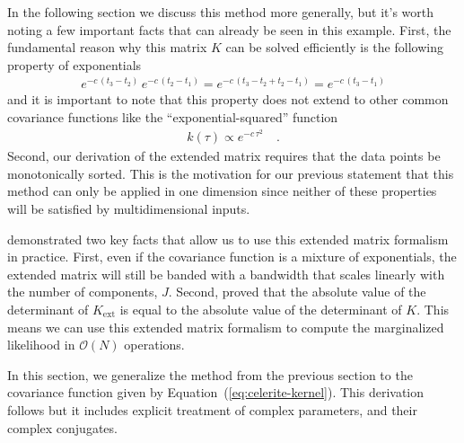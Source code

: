 \documentclass[manuscript, letterpaper]{aastex6}
\makeatletter
\let\origsubsection\subsection
\renewcommand\subsection{\@ifstar{\starsubsection}{\nostarsubsection}}
\newcommand\nostarsubsection[1]{\subsectionprelude\origsubsection{#1}}
\newcommand\starsubsection[1]{\subsectionprelude\origsubsection*{#1}}
\newcommand\subsectionprelude{\vspace{1em}}
\renewcommand{\eqref}[1]{\ref{eq:#1}}
\newcommand{\Eq}[1]{Equation~(\eqref{#1})}
\newcommand{\eq}[1]{\Eq{#1}}
\makeatother
\begin{document}
In the following section we discuss this method more generally, but it's
worth noting a few important facts that can already be seen in this example.
First, the fundamental reason why this matrix $K$ can be solved efficiently is
the following property of exponentials
\begin{eqnarray}
    e^{-c\,(t_3 - t_2)} \, e^{-c\,(t_2 - t_1)} =
    e^{-c\,(t_3 - t_2 + t_2 - t_1)} =
    e^{-c\,(t_3 - t_1)}
\end{eqnarray}
and it is important to note that this property does not extend to other common
covariance functions like the ``exponential-squared'' function
\begin{eqnarray}
    k(\tau) \propto e^{-c\,\tau^2} \quad.
\end{eqnarray}
Second, our derivation of the extended matrix requires that the data
points be monotonically sorted.
This is the motivation for our previous statement that this method can only be
applied in one dimension since neither of these properties will be satisfied
by multidimensional inputs.

\citet{Ambikasaran:2015} demonstrated two key facts that allow us to use this
extended matrix formalism in practice.
First, even if the covariance function is a mixture of exponentials, the
extended matrix will still be banded with a bandwidth that scales linearly
with the number of components, $J$.
Second, \citet{Ambikasaran:2015} proved that the absolute value of the
determinant of $K_\mathrm{ext}$ is equal to the absolute value of the
determinant of $K$.
This means we can use this extended matrix formalism to compute the
marginalized likelihood in $\mathcal{O}(N)$ operations.

\subsection{The algorithm}

In this section, we generalize the method from the previous section to the
covariance function given by \eq{celerite-kernel}.
This derivation follows \citet{Ambikasaran:2015} but it includes explicit
treatment of complex parameters, and their complex conjugates.
\end{document}
